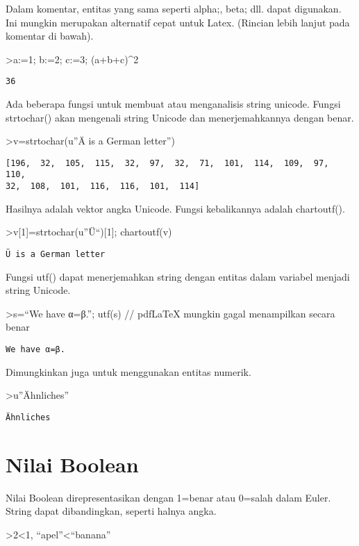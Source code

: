 \documentclass[
]{book}
\begin{document}
Dalam komentar, entitas yang sama seperti alpha;, beta; dll. dapat digunakan. Ini mungkin merupakan alternatif cepat untuk Latex. (Rincian lebih lanjut pada komentar di bawah).

\textgreater a:=1; b:=2; c:=3; (a+b+c)\^{}2

\begin{verbatim}
36
\end{verbatim}

Ada beberapa fungsi untuk membuat atau menganalisis string unicode. Fungsi strtochar() akan mengenali string Unicode dan menerjemahkannya dengan benar.

\textgreater v=strtochar(u''Ä is a German letter'')

\begin{verbatim}
[196,  32,  105,  115,  32,  97,  32,  71,  101,  114,  109,  97,  110,
32,  108,  101,  116,  116,  101,  114]
\end{verbatim}

Hasilnya adalah vektor angka Unicode. Fungsi kebalikannya adalah chartoutf().

\textgreater v{[}1{]}=strtochar(u''Ü``){[}1{]}; chartoutf(v)

\begin{verbatim}
Ü is a German letter
\end{verbatim}

Fungsi utf() dapat menerjemahkan string dengan entitas dalam variabel menjadi string Unicode.

\textgreater s=``We have α=β.''; utf(s) // pdfLaTeX mungkin gagal menampilkan secara benar

\begin{verbatim}
We have α=β.
\end{verbatim}

Dimungkinkan juga untuk menggunakan entitas numerik.

\textgreater u''Ähnliches''

\begin{verbatim}
Ähnliches
\end{verbatim}

\section{Nilai Boolean}\label{nilai-boolean}

Nilai Boolean direpresentasikan dengan 1=benar atau 0=salah dalam Euler. String dapat dibandingkan, seperti halnya angka.

\textgreater2\textless1, ``apel''\textless{}``banana''
\end{document}
